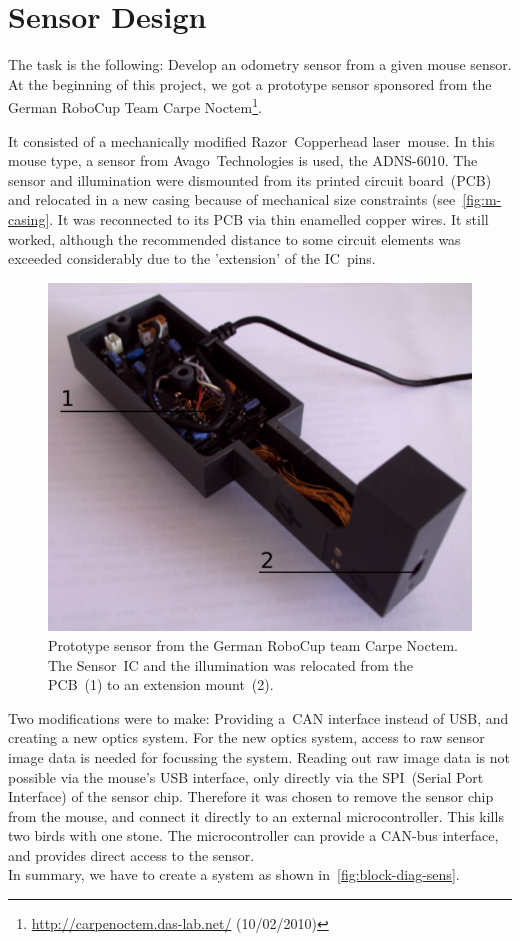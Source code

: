 \documentclass[12pt,a4paper]{article}
\begin{document}

\clearpage
\section{Sensor Design}

The task is the following: Develop an odometry sensor from a given mouse sensor.
At the beginning of this project, we got a prototype sensor sponsored from the German RoboCup Team Carpe Noctem\footnote{\url{http://carpenoctem.das-lab.net/} (10/02/2010)}.

It consisted of a mechanically modified Razor~Copperhead laser~mouse.
In this mouse type, a sensor from Avago~Technologies is used, the ADNS-6010.
The sensor and illumination were dismounted from its printed circuit board~(PCB) and relocated in a new casing because of mechanical size constraints (see~\autoref{fig:m-casing}.
It was reconnected to its PCB via thin enamelled copper wires.
It still worked, although the recommended distance to some circuit elements was exceeded considerably due to the 'extension' of the IC~pins.

\begin{figure}[hb]
\begin{center}  
\includegraphics[width=0.6\columnwidth]{figures/proto.pdf}
\caption{\label{fig:m-casing}
Prototype sensor from the German RoboCup team Carpe Noctem.
The Sensor~IC and the illumination was relocated from the PCB~(1) to an extension mount~(2).
}   
\end{center}
\end{figure}

Two modifications were to make: Providing a~CAN interface instead of USB, and creating a new optics system.
For the new optics system, access to raw sensor image data is needed for focussing the system.
Reading out raw image data is not possible via the mouse's USB interface, only directly via the SPI~(Serial Port Interface) of the sensor chip.
Therefore it was chosen to remove the sensor chip from the mouse, and connect it directly to an external microcontroller.
This kills two birds with one stone.
The microcontroller can provide a CAN-bus interface, and provides direct access to the sensor.\\
In summary, we have to create a system as shown in~\autoref{fig:block-diag-sens}.
\end{document}
